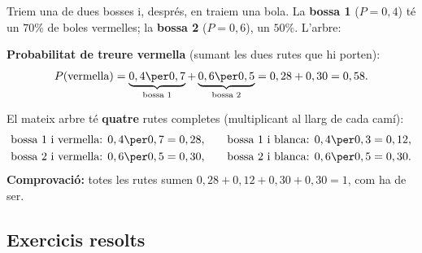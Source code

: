 \begin{exemple}
Triem una de dues bosses i, després, en traiem una bola. La \textbf{bossa 1} ($P=0,4$)
té un $70\%$ de boles vermelles; la \textbf{bossa 2} ($P=0,6$), un $50\%$. L'arbre:

\begin{center}

\end{center}

\noindent\textbf{Probabilitat de treure vermella} (sumant les dues rutes que hi porten):
\[
P(\text{vermella})=\underbrace{0,4\per 0,7}_{\text{bossa 1}}+\underbrace{0,6\per 0,5}_{\text{bossa 2}}
=0,28+0,30=0,58.
\]
\end{exemple}

\begin{exemple}
El mateix arbre té \textbf{quatre} rutes completes (multiplicant al llarg de cada camí):
\[
\begin{aligned}
&\text{bossa 1 i vermella: } 0,4\per 0,7=0,28, &\quad &\text{bossa 1 i blanca: } 0,4\per 0,3=0,12,\\
&\text{bossa 2 i vermella: } 0,6\per 0,5=0,30, &\quad &\text{bossa 2 i blanca: } 0,6\per 0,5=0,30.
\end{aligned}
\]
\textbf{Comprovació:} totes les rutes sumen $0,28+0,12+0,30+0,30=1$, com ha de ser.
\end{exemple}

\subsection{Exercicis resolts}

